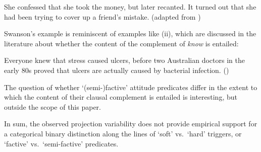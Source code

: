 \documentclass[11pt,fleqn]{article}
\newcommand{\6}{\mbox{$[\hspace*{-.6mm}[$}}
\newcommand{\9}{\mbox{$]\hspace*{-.6mm}]$}}
\begin{document}
{\begin{exe}
 She confessed that she took the money, but later recanted. It turned out that she had been trying to cover up a friend's mistake. \hfill (adapted from \citealt[1540]{swanson2012})
\end{exe}
%
%
Swanson's example is reminiscent of examples like (ii), which are discussed in the literature about whether the content of the complement of {\em know} is entailed:
\begin{exe}
 Everyone knew that stress caused ulcers, before two Australian doctors in the early 80s proved that ulcers are actually caused by bacterial infection. \hfill (\citealt[501]{hazlett2010})
\end{exe}
The question of whether `(semi-)factive' attitude predicates differ in the extent to which the content of their clausal complement is entailed is interesting, but outside the scope of this paper.} In sum, the observed projection variability does not provide empirical support for a categorical binary distinction along the lines of `soft' vs.\ `hard' triggers, or `factive' vs.\ `semi-factive' predicates.
\end{document}
